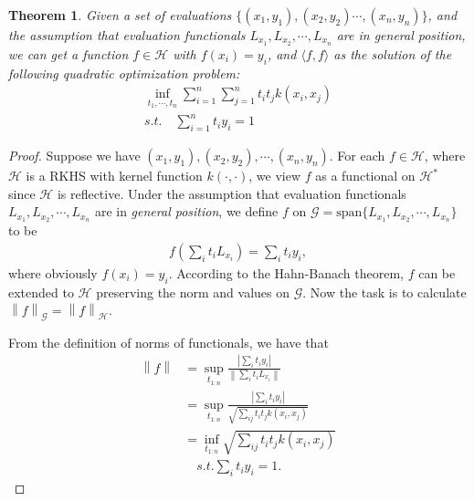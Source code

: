 \documentclass[a4paper]{article}
\newcommand{\up}{\mathrm}
\renewcommand{\cal}{\mathcal}
\newcommand{\norm}[1]{\left\lVert#1\right\rVert}
\newtheorem{theorem}{Theorem}
\begin{document}
\begin{theorem}
Given a set of evaluations $\{(x_1,y_1),(x_2,y_2)\cdots,(x_n,y_n)\}$, and the assumption that evaluation functionals $L_{x_1},L_{x_2},\cdots,L_{x_n}$ are in general position, we can get a function $f \in \cal{H}$ with $f(x_i) = y_i$, and $\langle f,f\rangle$ as the solution of the following quadratic optimization problem:
\begin{gather*}
\inf_{t_1,\cdots,t_n} \sum_{i=1}^n\sum_{j=1}^n t_it_j k(x_i,x_j)\\
s.t.\quad \sum_{i=1}^n t_i y_i = 1
\end{gather*}
\end{theorem}
\begin{proof}
Suppose we have $(x_1,y_1),(x_2,y_2),\cdots,(x_n,y_n)$. For each $f \in \cal{H}$, where $\cal{H}$ is a RKHS with kernel function $k(\cdot,\cdot)$, we view $f$ as a functional on $\cal{H}^*$ since $\cal{H}$ is reflective. Under the assumption that evaluation functionals $L_{x_1},L_{x_2},\cdots,L_{x_n}$ are in \textit{general position}, we define $f$ on $\cal{G} = \up{span} \{L_{x_1},L_{x_2},\cdots,L_{x_n}\}$ to be 
\begin{align}
f(\sum_i t_i L_{x_i}) = \sum_i t_i y_i,
\end{align}
where obviously $f(x_i) = y_i$. According to the Hahn-Banach theorem, $f$ can be extended to $\cal{H}$ preserving the norm and values on $\cal{G}$. Now the task is to calculate $\norm{f}_{\cal{G}} = \norm{f}_{\cal{H}}$.

From the definition of norms of functionals, we have that
\begin{align}
\norm{f} &= \sup_{t_{1:n}} \frac{|\sum_i t_i y_i|}{\norm{\sum_i t_i L_{x_i}}}\\
&= \sup_{t_{1:n}} \frac{|\sum_i t_i y_i|}{\sqrt{\sum_{ij} t_i t_j k(x_i,x_j)}}\\
&= \inf_{t_{1:n}} \sqrt{\sum_{ij} t_i t_j k(x_i,x_j)}\\
& \quad s.t. \sum_i t_i y_i = 1.
\end{align}
\end{proof}
\end{document}

